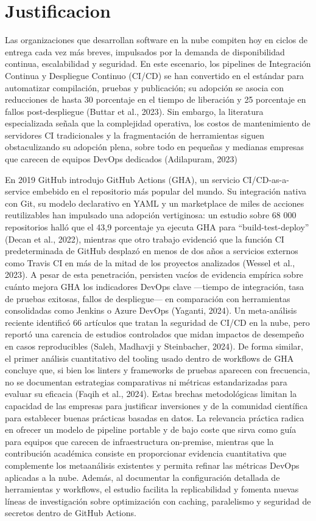 \section{Justificacion}

Las organizaciones que desarrollan software en la nube compiten hoy en ciclos de entrega cada vez más breves, impulsados por la demanda de disponibilidad continua, escalabilidad y seguridad. En este escenario, los pipelines de Integración Continua y Despliegue Continuo (CI/CD) se han convertido en el estándar para automatizar compilación, pruebas y publicación; su adopción se asocia con reducciones de hasta 30 porcentaje en el tiempo de liberación y 25 porcentaje en fallos post-despliegue (Buttar et al., 2023). Sin embargo, la literatura especializada señala que la complejidad operativa, los costos de mantenimiento de servidores CI tradicionales y la fragmentación de herramientas siguen obstaculizando su adopción plena, sobre todo en pequeñas y medianas empresas que carecen de equipos DevOps dedicados (Adilapuram, 2023)

En 2019 GitHub introdujo GitHub Actions (GHA), un servicio CI/CD-as-a-service embebido en el repositorio más popular del mundo. Su integración nativa con Git, su modelo declarativo en YAML y un marketplace de miles de acciones reutilizables han impulsado una adopción vertiginosa: un estudio sobre 68 000 repositorios halló que el 43,9 porcentaje ya ejecuta GHA para “build-test-deploy” (Decan et al., 2022), mientras que otro trabajo evidenció que la función CI predeterminada de GitHub desplazó en menos de dos años a servicios externos como Travis CI en más de la mitad de los proyectos analizados (Wessel et al., 2023).
A pesar de esta penetración, persisten vacíos de evidencia empírica sobre cuánto mejora GHA los indicadores DevOps clave —tiempo de integración, tasa de pruebas exitosas, fallos de despliegue— en comparación con herramientas consolidadas como Jenkins o Azure DevOps (Yaganti, 2024).
Un meta-análisis reciente identificó 66 artículos que tratan la seguridad de CI/CD en la nube, pero reportó una carencia de estudios controlados que midan impactos de desempeño en casos reproducibles (Saleh, Madhavji y Steinbacher, 2024).
De forma similar, el primer análisis cuantitativo del tooling usado dentro de workflows de GHA concluye que, si bien los linters y frameworks de pruebas aparecen con frecuencia, no se documentan estrategias comparativas ni métricas estandarizadas para evaluar su eficacia (Faqih et al., 2024).
Estas brechas metodológicas limitan la capacidad de las empresas para justificar inversiones y de la comunidad científica para establecer buenas prácticas basadas en datos.
La relevancia práctica radica en ofrecer un modelo de pipeline portable y de bajo coste que sirva como guía para equipos que carecen de infraestructura on-premise, mientras que la contribución académica consiste en proporcionar evidencia cuantitativa que complemente los metaanálisis existentes y permita refinar las métricas DevOps aplicadas a la nube. Además, al documentar la configuración detallada de herramientas y workflows, el estudio facilita la replicabilidad y fomenta nuevas líneas de investigación sobre optimización con caching, paralelismo y seguridad de secretos dentro de GitHub Actions.

